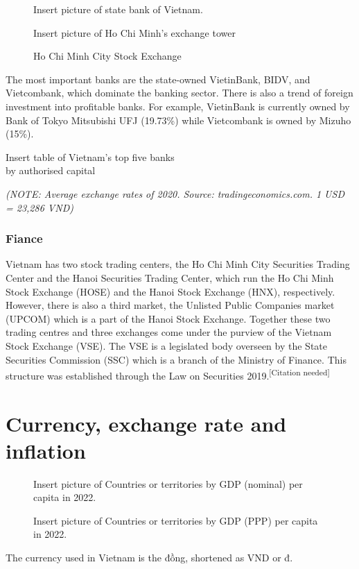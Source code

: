 \documentclass{article}
\begin{document}
\begin{figure}
    \begin{framed}
    Insert picture of state bank of Vietnam.
    \caption*{State Bank of Vietnam in Ho Chi Minh City (Saigon)}
    \end{framed}
    
    \begin{framed}
    Insert picture of Ho Chi Minh's exchange tower
    \caption*{Ho Chi Minh City Stock Exchange}
    \end{framed}
    \vspace{-50pt}
\end{figure}
The most important banks are the state-owned VietinBank, BIDV, and Vietcombank, which dominate the banking sector. There is also a trend of foreign investment into profitable banks. For example, VietinBank is currently owned by Bank of Tokyo Mitsubishi UFJ (19.73\%) while Vietcombank is owned by Mizuho (15\%).

\begin{table}[h]
    Insert table of Vietnam's top five banks\\by authorised capital
\end{table}
\textit{(NOTE: Average exchange rates of 2020. Source: tradingeconomics.com. 1 USD = 23,286 VND)}

\subsubsection*{Fiance}
Vietnam has two stock trading centers, the Ho Chi Minh City Securities Trading Center and the Hanoi Securities Trading Center, which run the Ho Chi Minh Stock Exchange (HOSE) and the Hanoi Stock Exchange (HNX), respectively. However, there is also a third market, the Unlisted Public Companies market (UPCOM) which is a part of the Hanoi Stock Exchange. Together these two trading centres and three exchanges come under the purview of the Vietnam Stock Exchange (VSE). The VSE is a legislated body overseen by the State Securities Commission (SSC) which is a branch of the Ministry of Finance. This structure was established through the Law on Securities 2019.\textsuperscript{[Citation needed]}

\section*{Currency, exchange rate and inflation}

\begin{figure}
    \begin{framed}
    Insert picture of Countries or territories by GDP (nominal) per capita in 2022.
    \end{framed}
    
    \begin{framed}
    Insert picture of Countries or territories by GDP (PPP) per capita in 2022.
    \end{framed}
    \vspace{-30pt}
\end{figure}
The currency used in Vietnam is the đồng, shortened as VND or đ.
\end{document}
